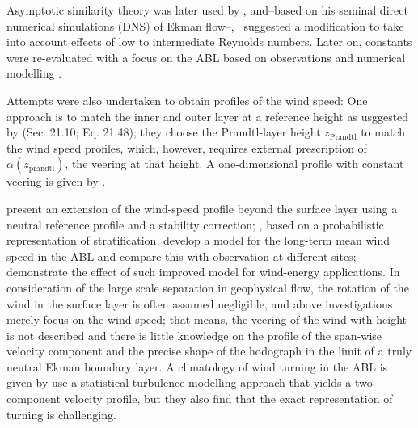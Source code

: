 \documentclass[smallcondensed,final]{svjour3}
\begin{document}
%
Asymptotic similarity theory was later used by \cite{tennekes:JAS1973, blackadar:JAS1968},
and--based on his seminal direct numerical simulations (DNS) of Ekman flow--,~\cite{spalart:JFM1989} suggested
a modification to take into account effects of low to intermediate Reynolds numbers.
Later on, constants were re-evaluated with a focus on the ABL based on
observations \citep{hogstrom:BM1988,hogstrom:BM1996}
and numerical modelling \citep{spalart:PF2008, spalart:PF2009, ansorge:BM2014, ansorge:BM2019}.
%
\par
%
Attempts were also undertaken to obtain profiles of the wind speed: 
One approach is to match the inner and outer layer at a reference height as usggested by
\cite{etling:2002, emeis:2018}  (Sec. 21.10; Eq. 21.48); they choose the Prandtl-layer height $z_\text{Prandtl}$ to match
the wind speed profiles, which, however, requires external prescription of $\alpha(z_\text{prandtl})$, the veering at that height. 
A one-dimensional profile with constant veering is given by \citet[Sec. 3; Eq. 3.1-3.19]{emeis:m2007}. 

\citet{gryning:BM2007} present an extension of the wind-speed profile beyond the surface layer
using a neutral reference profile and a stability correction;
\cite{kelly:BM2010}, based on a probabilistic representation of stratification,
develop a model for the long-term mean wind speed
in the ABL and compare this with observation at different sites; 
\cite{kelly:WE2016} demonstrate the effect of such improved model for wind-energy applications.
%
In consideration of the large scale separation in geophysical flow, the rotation of the wind in the
surface layer is often assumed negligible, and above investigations merely focus on the wind speed; 
that means, the veering of the wind with height is not described and there is little knowledge on the
profile of the span-wise velocity component and the precise shape of the hodograph in the limit of a
truly neutral Ekman boundary layer.
%
A climatology of wind turning in the ABL is given by \cite{lindvall:QJR2019} 
%
\cite{klein:PAM2021a} use a statistical turbulence modelling approach that yields a two-component velocity profile,
but they also find that the exact representation of turning is challenging.
\end{document}
